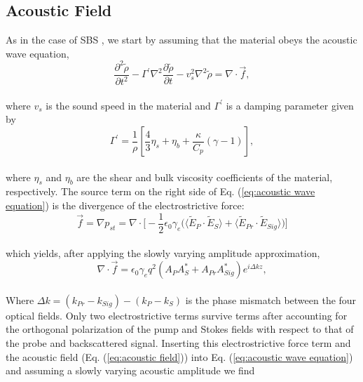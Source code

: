 \documentclass[%
  reprint,
  superscriptaddress,
  amsmath,amssymb,
  aps,
  prapplied,
]{revtex4-2}
\begin{document}
\subsection{Acoustic Field}
\label{Coupled-Wave Equations:Acoustic Field}

As in the case of SBS \cite{boyd2020nonlinear}, we start by assuming that the material obeys the acoustic wave equation,
\\
\begin{equation}
    \frac{\partial^{2}\tilde{\rho}}{\partial t^{2}} - \Gamma^{\prime}\nabla^{2}\frac{\partial\tilde{\rho}}{\partial t} - v_{s}^{2}\nabla^{2}\tilde{\rho} = \nabla\cdot\vec{f},
    \label{eq:acoustic wave equation}
\end{equation}
\\
\noindent where $v_{s}$ is the sound speed in the material and $\Gamma^{\prime}$ is a damping parameter given by
\\
\begin{equation}
    \Gamma^{\prime} = \frac{1}{\rho}\left[\frac{4}{3}\eta_{s} + \eta_{b} + \frac{\kappa}{C_{p}}(\gamma - 1)\right],
\end{equation}
\\
\noindent where $\eta_{s}$ and $\eta_{b}$ are the shear and bulk viscosity coefficients of the material, respectively. The source term on the right side of Eq. (\ref{eq:acoustic wave equation}) is the divergence of the electrostrictive force:
\\
\begin{equation}
    \vec{f} = \nabla p_{st} = \nabla \cdot \Bigg[-\frac{1}{2}\epsilon_{0}\gamma_{e}\Big(\langle\tilde{E}_{P} \cdot \tilde{E}_{S}\rangle + \langle\tilde{E}_{Pr} \cdot \tilde{E}_{Sig}\rangle\Big)\Bigg]
\end{equation}
\\
which yields, after applying the slowly varying amplitude approximation,
\\
\begin{equation}
    \nabla\cdot\vec{f} = \epsilon_{0}\gamma_{e}q^{2}(A_{P}A_{S}^{*} + A_{Pr}A_{Sig}^{*})e^{i\Delta kz},
\end{equation}
\\
Where $\Delta k = (k_{Pr} - k_{Sig}) - (k_{P} - k_{S})$ is the phase mismatch between the four optical fields. Only two electrostrictive terms survive terms after accounting for the orthogonal polarization of the pump and Stokes fields with respect to that of the probe and backscattered signal. Inserting this electrostrictive force term and the acoustic field (Eq. (\ref{eq:acoustic field})) into Eq. (\ref{eq:acoustic wave equation}) and assuming a slowly varying acoustic amplitude we find
\end{document}
